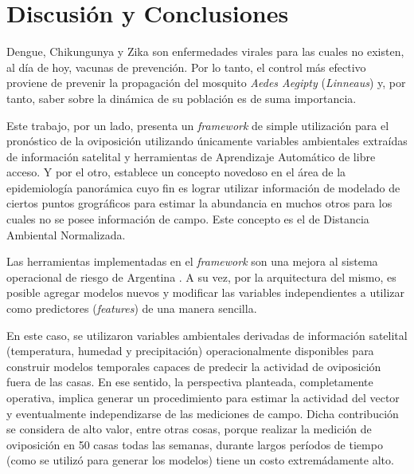 %
%
%

\justifying

\chapter{Discusión y Conclusiones}

  \par Dengue, Chikungunya y Zika son enfermedades virales para las cuales no
    existen, al día de hoy, vacunas de prevención. Por lo tanto, el control
    más efectivo proviene de prevenir la propagación del mosquito
    \textit{Aedes Aegipty} (\textit{Linneaus}) y, por tanto, saber sobre la
    dinámica de su población es de suma importancia.

  \par Este trabajo, por un lado, presenta un \textit{framework} de simple
    utilización para el
    pronóstico de la oviposición utilizando
    únicamente variables ambientales extraídas de información satelital y
    herramientas de Aprendizaje Automático de libre acceso. Y por el otro,
    establece un concepto novedoso en el área de la epidemiología panorámica
    cuyo fin es lograr utilizar información de modelado de ciertos puntos grográficos
    para estimar la abundancia en muchos otros para los cuales no se posee
    información de campo. Este concepto es el de Distancia Ambiental Normalizada.

  \par Las herramientas implementadas en el \textit{framework}
    son una mejora al sistema operacional de riesgo de
    Argentina \cite{porcasi_operative}. A su vez, por la arquitectura del mismo,
    es posible agregar modelos nuevos y modificar las variables independientes a utilizar como
    predictores (\textit{features}) de una manera sencilla.

  \par En este caso, se utilizaron variables ambientales derivadas de información satelital
    (temperatura, humedad y precipitación) operacionalmente disponibles para
    construir modelos temporales capaces de predecir la actividad de oviposición
    fuera de las casas. En ese sentido, la perspectiva planteada, completamente operativa,
    implica generar un procedimiento para estimar la actividad del vector
    y eventualmente independizarse de las mediciones de campo. Dicha contribución
    se considera de alto valor, entre otras cosas, porque realizar la medición
    de oviposición en 50 casas todas las semanas, durante
    largos períodos de tiempo (como se utilizó para generar los modelos) tiene
    un costo extremádamente alto.

